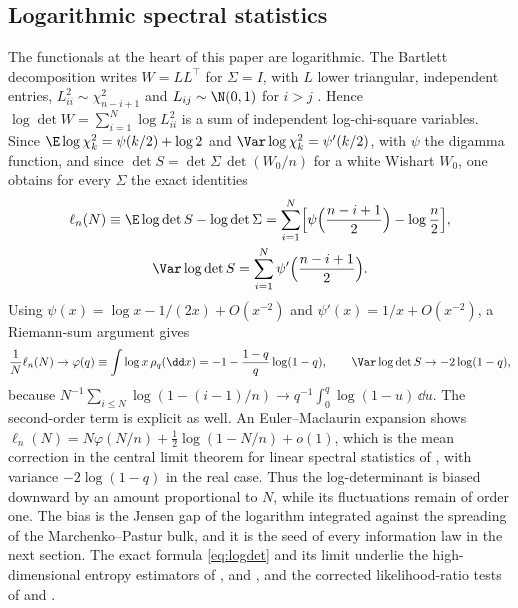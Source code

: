 \subsection*{Logarithmic spectral statistics}

The functionals at the heart of this paper are logarithmic. The Bartlett decomposition writes $W=LL^\top$ for $\Sigma=I$, with $L$ lower triangular, independent entries, $L_{ii}^2\sim\chi^2_{n-i+1}$ and $L_{ij}\sim\N(0,1)$ for $i>j$ \citep[Ch.~3]{muirhead1982aspects}. Hence $\log\det W=\sum_{i=1}^N\log L_{ii}^2$ is a sum of independent log-chi-square variables. Since $\E\log\chi^2_k=\psi(k/2)+\log2$ and $\Var\log\chi^2_k=\psi'(k/2)$, with $\psi$ the digamma function, and since $\det S=\det\Sigma\,\det(W_0/n)$ for a white Wishart $W_0$, one obtains for every $\Sigma$ the exact identities
\begin{equation}
 \begin{gathered}
 \ell_n(N)\equiv\E\log\det S-\log\det\Sigma=\sum_{i=1}^N\Bigl[\psi\Bigl(\frac{n-i+1}2\Bigr)-\log\frac n2\Bigr],\\
 \Var\log\det S=\sum_{i=1}^N\psi'\Bigl(\frac{n-i+1}2\Bigr).
 \end{gathered}
 \label{eq:logdet}
\end{equation}
Using $\psi(x)=\log x-1/(2x)+O(x^{-2})$ and $\psi'(x)=1/x+O(x^{-2})$, a Riemann-sum argument gives
\begin{equation}
 \frac1N\ell_n(N)\to\varphi(q)\equiv\int\log x\,\rho_q(\dd x)=-1-\frac{1-q}q\log(1-q),\qquad
 \Var\log\det S\to-2\log(1-q),
 \label{eq:phi}
\end{equation}
because $N^{-1}\sum_{i\le N}\log(1-(i-1)/n)\to q^{-1}\int_0^q\log(1-u)\,\dd u$. The second-order term is explicit as well. An Euler--Maclaurin expansion shows $\ell_n(N)=N\varphi(N/n)+\tfrac12\log(1-N/n)+o(1)$, which is the mean correction in the central limit theorem for linear spectral statistics of \citet{bai2004clt}, with variance $-2\log(1-q)$ in the real case. Thus the log-determinant is biased downward by an amount proportional to $N$, while its fluctuations remain of order one. The bias is the Jensen gap of the logarithm integrated against the spreading of the Marchenko--Pastur bulk, and it is the seed of every information law in the next section. The exact formula \eqref{eq:logdet} and its limit underlie the high-dimensional entropy estimators of \citet{ahmed1989entropy}, \citet{misra2005estimation} and \citet{cai2015law}, and the corrected likelihood-ratio tests of \citet{bai2009corrections} and \citet{jiang2013central}.
